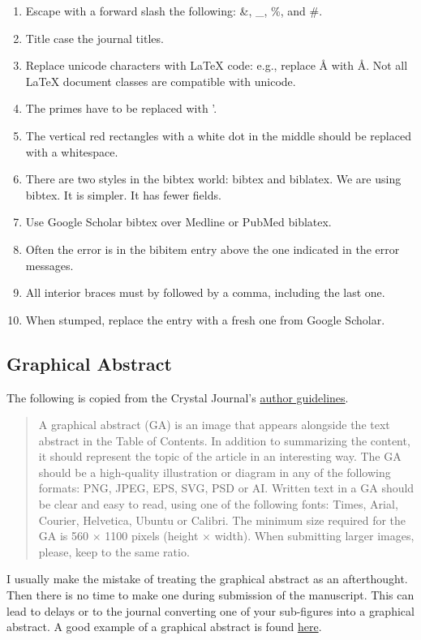 \documentclass[10pt,letterpaper]{article}
\newcommand{\be}{\begin{enumerate}}
\newcommand{\ee}{\end{enumerate}}
\begin{document}
\be
\item Escape with a forward slash the following: \&, \_, \%, and \#. 
\item Title case the journal titles.
\item Replace unicode characters with LaTeX code: e.g., replace Å with \AA. Not all LaTeX document classes are compatible with unicode.
\item The primes have to be replaced with '.
\item The vertical red rectangles with a white dot in the middle should be replaced with a whitespace.
\item There are two styles in the bibtex world: bibtex and biblatex. We are using bibtex. It is simpler. It has fewer fields.
\item Use Google Scholar bibtex over Medline or PubMed biblatex. 
\item Often the error is in the bibitem entry above the one indicated in the error messages.
\item All interior braces must by followed by a comma, including the last one.
\item When stumped, replace the entry with a fresh one from Google Scholar.
\ee



\subsection{Graphical Abstract}
\label{subsec:guides:graphicalAbstract}


The following is copied from the Crystal Journal's \href{https://www.mdpi.com/journal/crystals/instructions#preparation}{author guidelines}.

\begin{quote}
A graphical abstract (GA) is an image that appears alongside the text abstract in the Table of Contents. 
In addition to summarizing the content, it should represent the topic of the article in an interesting way.
The GA should be a high-quality illustration or diagram in any of the following formats: PNG, JPEG, EPS, SVG, PSD or AI. 
Written text in a GA should be clear and easy to read, using one of the following fonts: Times, Arial, Courier, Helvetica, Ubuntu or Calibri.
The minimum size required for the GA is 560 $\times$ 1100 pixels (height $\times$ width). 
When submitting larger images, please, keep to the same ratio.
\end{quote}

I usually make the mistake of treating the graphical abstract as an afterthought.
Then there is no time to make one during submission of the manuscript.
This can lead to delays or to the journal converting one of your sub-figures into a graphical abstract.
A good example of a graphical abstract is found \href{https://www.mdpi.com/2073-4352/11/3/273}{here}.
\end{document}
